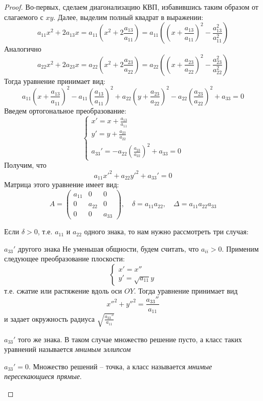 \begin{proof}
	Во-первых, сделаем диагонализацию КВП, избавившись таким образом от слагаемого с $xy$.
	Далее, выделим полный квадрат в выражении:
	\[a_{11} x^2 + 2a_{13} x = a_{11} \left(x^2 + 2 \frac{a_{13}}{a_{11}}\right) = a_{11} \left(\left(x + \frac{a_{13}}{a_{11}}\right)^2 - \frac{a_{13}^2}{a_{11}^2}\right)\]
	Аналогично
	\[a_{22} x^2 + 2a_{23} x = a_{22} \left(x^2 + 2 \frac{a_{23}}{a_{22}}\right) = a_{22} \left(\left(x + \frac{a_{23}}{a_{22}}\right)^2 - \frac{a_{23}^2}{a_{22}^2}\right)\]
	Тогда уравнение принимает вид:
	\[a_{11} \left(x + \frac{a_{13}}{a_{11}}\right)^2 - a_{11} \left(\frac{a_{13}}{a_{11}}\right)^2 + a_{22} \left(y + \frac{a_{23}}{a_{22}}\right)^2 - a_{22} \left(\frac{a_{23}}{a_{22}}\right)^2 + a_{33} = 0\]
	Введем ортогональное преобразование:
	\[\begin{cases}
		x' = x + \frac{a_{13}}{a_{11}} \\
		y' = y + \frac{a_{23}}{a_{22}} \\
		a_{33}' = -a_{22} \left(\frac{a_{23}}{a_{22}}\right)^2 + a_{33} = 0
	\end{cases}\]
	Получим, что
	\[a_{11} x'^2 + a_{22} y'^2 + a_{33}' = 0\]
	Матрица этого уравнение имеет вид:
	\[A = \left(\begin{array}{ccc}
	a_{11} & 0 & 0 \\ 
	0 & a_{22} & 0 \\ 
	0 & 0 & a_{33}
	\end{array}\right), \quad \delta = a_{11} a_{22}, \quad \Delta = a_{11} a_{22} a_{33}\]

	Если $\delta > 0$, т.е. $a_{11}$ и $a_{22}$ одного знака, то нам нужно рассмотреть три случая:
	\begin{MyList}
		\item $a_{33}'$ другого знака
		Не уменьшая общности, будем считать, что $a_{ii} > 0$. Применим следующее преобразование плоскости:
		\[\begin{cases}
			x' = x'' \\
			y' = \sqrt{a_{11}} y
		\end{cases}\]
		т.е. сжатие или растяжение вдоль оси $OY$.
		Тогда уравнение принимает вид
		\[x''^2 + y''^2 = \frac{a_{33}''}{a_{11}}\]
		и задает окружность радиуса $\sqrt{ \frac{a_{33}''}{a_{11}}}$ 
		\begin{figure}[H]
			\centering
			\def\svgwidth{.35\columnwidth}
			
		\end{figure}
		\item $a_{33}'$ того же знака. В таком случае множество решение пусто, а класс таких уравнений называется \textit{мнимым эллипсом}
		\item $a_{33}' = 0$.  Множество решений -- точка, а класс называется \textit{мнимые пересекающиеся прямые}. 
	\end{MyList}


\end{proof}
